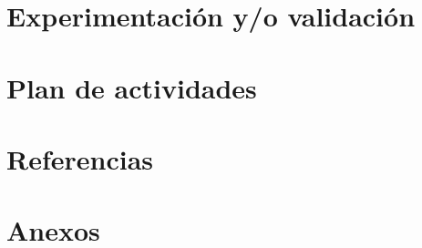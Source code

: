 \documentclass[a4paper,11pt]{article}
\begin{document}
\section{Experimentación y/o validación}

\newpage

\section{Plan de actividades}

\newpage

\section{Referencias}

\newpage

\section{Anexos}

\newpage
\end{document}
